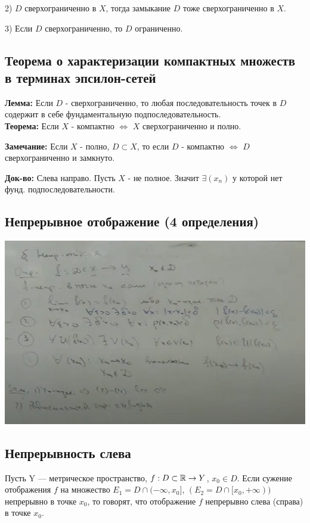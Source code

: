 2) $D$ сверхограниченно в $X$, тогда замыкание $D$ тоже сверхограниченно в $X$.

3) Если $D$ сверхограниченно, то $D$ ограниченно.


\newpage
\subsection{Теорема о характеризации компактных множеств в терминах эпсилон-сетей}

\textbf{Лемма:} Если $D$ - сверхограниченно, то любая последовательность точек в $D$ содержит в себе фундаментальную подпоследовательность. \\ 

\textbf{Теорема:} Если $X$ - компактно $\Leftrightarrow$ $X$ сверхограниченно и полно.

\textbf{Замечание:} Если $X$ - полно, $D \subset X$, то если $D$ - компактно $\Leftrightarrow$ $D$ сверхограниченно и замкнуто.


\textbf{Док-во:} Слева направо. Пусть $X$ - не полное. Значит $\exists (x_n)$ у которой нет фунд. подпоследовательности. 


\newpage
\subsection{Непрерывное отображение (4 определения)}

\includegraphics[scale=0.4]{Images/непрерывн отобр.png}

\newpage
{}
\subsection{Непрерывность слева}

Пусть Y — метрическое пространство, $f : D \subset \operatorname*{\mathbb{R}} \to Y$, $x_0 \in D$. Если сужение отображения $f$ на множество 
$E_1 = D \cap (- \infty,x_0]$, $(E_2 = D \cap [x_0,+\infty))$ непрерывно в точке $x_0$, то говорят, что отображение $f$ непрерывно слева (справа) в точке $x_0$.

